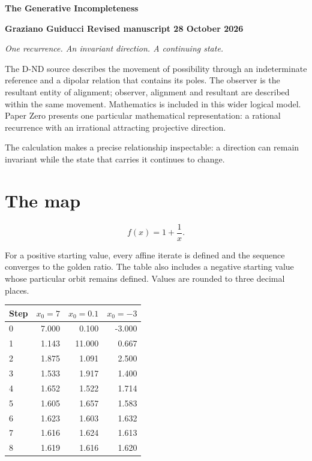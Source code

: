 \documentclass[10pt,a4paper]{article}
\begin{document}
\begin{center}{\LARGE\bfseries The Generative Incompleteness}\end{center}

\textbf{Graziano Guiducci \textperiodcentered{}  Revised manuscript \textperiodcentered{}  28 October 2026}
\par

\emph{One recurrence. An invariant direction. A continuing state.}
\par

The D-ND source describes the movement of possibility through an indeterminate reference and a dipolar relation that contains its poles. The observer is the resultant entity of alignment; observer, alignment and resultant are described within the same movement. Mathematics is included in this wider logical model. Paper Zero presents one particular mathematical representation: a rational recurrence with an irrational attracting projective direction.
\par

The calculation makes a precise relationship inspectable: a direction can remain invariant while the state that carries it continues to change.
\par

\section*{The map}

\[
f(x)=1+\frac{1}{x}.
\]

For a positive starting value, every affine iterate is defined and the sequence converges to the golden ratio. The table also includes a negative starting value whose particular orbit remains defined. Values are rounded to three decimal places.
\par

\begin{center}
\begin{tabular}{lrrr}
\toprule
Step & $x_0=7$ & $x_0=0.1$ & $x_0=-3$ \\
\midrule
0 & 7.000 & 0.100 & -3.000 \\
1 & 1.143 & 11.000 & 0.667 \\
2 & 1.875 & 1.091 & 2.500 \\
3 & 1.533 & 1.917 & 1.400 \\
4 & 1.652 & 1.522 & 1.714 \\
5 & 1.605 & 1.657 & 1.583 \\
6 & 1.623 & 1.603 & 1.632 \\
7 & 1.616 & 1.624 & 1.613 \\
8 & 1.619 & 1.616 & 1.620 \\
\bottomrule
\end{tabular}
\end{center}
\end{document}
